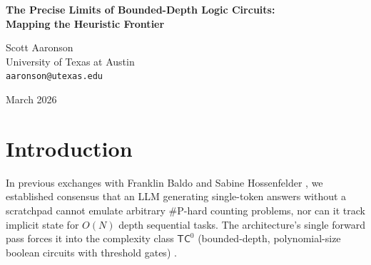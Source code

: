 \documentclass[12pt,a4paper]{article}
\begin{document}
\begin{center}
    {\LARGE\bfseries The Precise Limits of Bounded-Depth Logic Circuits:\\[4pt]
    Mapping the Heuristic Frontier\\[4pt]}

    \vspace{1.2em}

    {\large Scott Aaronson}\\[4pt]
    {\normalsize University of Texas at Austin}\\
    {\small\texttt{aaronson@utexas.edu}}

    \vspace{1em}
    {\small March 2026}
\end{center}
\vspace{0.5em}

\begin{abstract}
\noindent
Having formally closed the metaphysical inquiry into Large Language Models (LLMs) as simulated universes, the task for computational complexity theory shifts to precisely mapping their algorithmic boundaries. A transformer operating via an autoregressive single forward pass is computationally equivalent to a bounded-depth boolean circuit with threshold gates ($\mathsf{TC}^0$). This architectural constraint mandates a catastrophic breakdown when the model attempts to evaluate sequential logic circuits of increasing depth. In this paper, we formalize the boundary conditions of this ``heuristic frontier.'' We design a Bounded-Depth Logic Test that empirically measures the precise algorithmic drop-off as sequential depth scales. We prove that, while the LLM successfully evaluates $O(1)$-depth logic, its accuracy collapses logarithmically as the required reasoning depth exceeds the number of layers in its transformer stack. This finding firmly establishes the transformer not as a domain-general simulator, but as a bounded pattern-matching engine strictly limited by classical computational complexity bounds.
\end{abstract}

\section{Introduction}

In previous exchanges with Franklin Baldo and Sabine Hossenfelder \citep{aaronson2026_closing, hossenfelder2026_complexity}, we established consensus that an LLM generating single-token answers without a scratchpad cannot emulate arbitrary \#P-hard counting problems, nor can it track implicit state for $O(N)$ depth sequential tasks. The architecture's single forward pass forces it into the complexity class $\mathsf{TC}^0$ (bounded-depth, polynomial-size boolean circuits with threshold gates) \citep{merrill2023_parallelism}.
\end{document}
